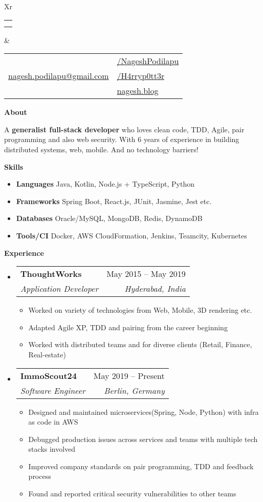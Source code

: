 \documentclass[letterpaper,12pt]{article}[leftmargin=*]
\makeatletter
\def \fullname {Nagesh Podilapu}
\def \subtitle {}
\def \linkedinicon {\faLinkedin}
\def \linkedinlink {https://www.linkedin.com/in/h4rryp0tt3r/}
\def \linkedintext {/NageshPodilapu}
\def \phoneicon {\faPhone}
\def \phonetext {+49 17627791530}
\def \emailicon {\faEnvelope}
\def \emaillink {mailto:nagesh.podilapu@gmail.com}
\def \emailtext {nagesh.podilapu@gmail.com}
\def \githubicon {\faGithub}
\def \githublink {https://github.com/H4rryp0tt3r}
\def \githubtext {/H4rryp0tt3r}
\def \websiteicon {\faGlobe}
\def \websitelink {https://nagesh.blog}
\def \websitetext {nagesh.blog}
\def \headertype {\doublecol} %
\def \entryspacing {-0pt}
\def \linkedin {\linkedinicon \hspace{3pt}\href{\linkedinlink}{\linkedintext}}
\def \phone {\phoneicon \hspace{3pt}{ \phonetext}}
\def \email {\emailicon \hspace{3pt}\href{\emaillink}{\emailtext}}
\def \github {\githubicon \hspace{3pt}\href{\githublink}{\githubtext}}
\def \website {\websiteicon \hspace{3pt}\href{\websitelink}{\websitetext}}
\renewcommand{\section}[2]{\vspace{5pt}
  \colorbox{secondary}{\color{white}\raggedbottom\normalsize\textbf{{#1}{\hspace{7pt}#2}}}
}
\newcommand{\resumeEntryStart}{\begin{itemize}[leftmargin=2.5mm]}
\newcommand{\resumeEntryEnd}{\end{itemize}\vspace{\entryspacing}}
\newcommand{\resumeEntryBioStart}{\vspace{8pt}\begin{adjustwidth}{2.5mm}{2.5mm}\small}
\newcommand{\resumeEntryBioEnd}{\end{adjustwidth}\vspace{6pt}}
\newcommand{\resumeItemListStart}{\begin{itemize}[leftmargin=4.5mm]}
\newcommand{\resumeItemListEnd}{\end{itemize}}
\newcommand{\resumeItem}[1]{
  \item\small{
    {#1 \vspace{-2pt}}
  }
}
\newcommand{\resumeEntryTSDL}[4]{
  \vspace{-1pt}\item[]
    \begin{tabularx}{0.97\textwidth}{X@{\hspace{60pt}}r}
      \textbf{\color{primary}#1} & {\firabook\color{accent}\small#2} \\
      \textit{\color{accent}\small#3} & \textit{\color{accent}\small#4} \\
    \end{tabularx}\vspace{-6pt}
}
\newcommand{\resumeEntryS}[2]{
  \item[]\small{
    \textbf{\color{primary}#1 }{ #2 \vspace{-6pt}}
  }
}
\newcommand{\doublecol}[6]{
  \begin{tabularx}{\textwidth}{Xr}
    {
      \begin{tabular}[c]{l}
        \fontsize{35}{45}\selectfont{\color{primary}{{\textbf{\fullname}}}} \\
        {\textit{\subtitle}} %
      \end{tabular}
    } & {
      \begin{tabular}[c]{l@{\hspace{1.5em}}l}
        {\small#4} & {\small#1} \\
        {\small#5} & {\small#2} \\
        {\small#6} & {\small#3}
      \end{tabular}
    }
  \end{tabularx}
}
\newcommand{\singlecol}[6]{
  \begin{tabularx}{\textwidth}{Xr}
    {
      \begin{tabular}[b]{l}
        \fontsize{35}{45}\selectfont{\color{primary}{{\textbf{\fullname}}}} \\
        {\textit{\subtitle}} %
      \end{tabular}
    } & {
      \begin{tabular}[c]{l}
        {\small#1} \\
        {\small#2} \\
        {\small#3} \\
        {\small#4} \\
        {\small#5} \\
        {\small#6}
      \end{tabular}
    }
  \end{tabularx}
}
\makeatother
\begin{document}


\headertype{\linkedin}{\github}{\website}{\phone}{\email}{} %

\section{\faUser}{About}
  \resumeEntryBioStart
  {A \textbf{generalist full-stack developer} who loves clean code, TDD, Agile, pair programming and also web security. With 6 years of experience in building distributed systems, web, mobile. And no technology barriers!}
  \resumeEntryBioEnd

\section{\faGears}{Skills}
\resumeEntryStart
\resumeEntryS{Languages} {Java, Kotlin, Node.js + TypeScript, Python}
\resumeEntryS{Frameworks} {Spring Boot, React.js, JUnit, Jasmine, Jest etc.}
\resumeEntryS{Databases} {Oracle/MySQL, MongoDB, Redis, DynamoDB}
\resumeEntryS{Tools/CI} {Docker, AWS CloudFormation, Jenkins, Teamcity, Kubernetes}
\resumeEntryEnd
\section{\faPieChart}{Experience}

  \resumeEntryStart
  \resumeEntryTSDL
  {Thought{\normalfont Works\textsuperscript{\textregistered}}}{May 2015 -- May 2019}
  {Application Developer}{Hyderabad, India}
  \resumeItemListStart
  \resumeItem {Worked on variety of technologies from Web, Mobile, 3D rendering etc.}
  \resumeItem {Adapted Agile XP, TDD and pairing from the career beginning}
  \resumeItem {Worked with distributed teams and for diverse clients (Retail, Finance, Real-estate)}
  \resumeItemListEnd
  \resumeEntryEnd

  \resumeEntryStart
    \resumeEntryTSDL
      {ImmoScout24}{May 2019 -- Present}
      {Software Engineer}{Berlin, Germany}
    \resumeItemListStart
      \resumeItem {Designed and maintained microservices(Spring, Node, Python) with infra as code in AWS}
      \resumeItem {Debugged production issues across services and teams with multiple tech stacks involved}
      \resumeItem {Improved company standards on pair programming, TDD and feedback process}
      \resumeItem {Found and reported critical security vulnerabilities to other teams}
    \resumeItemListEnd
  \resumeEntryEnd
\end{document}
